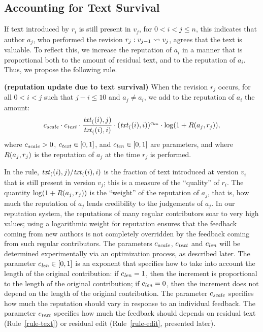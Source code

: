 \subsection{Accounting for Text Survival} 

If text introduced by $r_i$ is still present in $v_j$, for 
$0 < i < j \leq n$, this indicates that author $a_j$, who performed the
revision $r_j: v_{j-1} \rightsquigarrow v_j$, agrees that the text is valuable. 
To reflect this, we increase the reputation of $a_i$ in a manner that
is proportional both to the amount of residual text, and to the
reputation of $a_i$. 
Thus, we propose the following rule.

\begin{regola} \textbf{(reputation update due to text survival)} \label{rule-text}
  When the revision $r_j$ occurs, for all $0 < i < j$ such that 
  $j - i \leq 10$ and $a_j \neq a_i$, we add to the reputation
  of $a_i$ the amount: 
  \[
    {c_{{\text{\textit{scale}}}}} \cdot {c_{{\text{\textit{text}}}}} \cdot \frac{\mathit{txt}_{(}(i),j)}{\mathit{txt}_{(}(i),i)} 
    \cdot (\mathit{txt}_{(}(i),i))^{c_{{\text{\textit{len}}}}} \cdot \log(1 + R(a_j,r_j)),
  \]
  where ${c_{{\text{\textit{scale}}}}} > 0$, ${c_{{\text{\textit{text}}}}} \in [0,1]$, and ${c_{{\text{\textit{len}}}}} \in
  [0,1]$ are parameters, and where $R(a_j,r_j)$ is the reputation of $a_j$
  at the time $r_j$ is performed. 
\end{regola}

\noindent
In the rule, $\mathit{txt}_{(}(i),j) / \mathit{txt}_{(}(i),i)$ is the fraction of text
introduced at version $v_i$ that is still present in version $v_j$;
this is a measure of the ``quality'' of $r_i$. 
The quantity $\log(1 + R(a_j,r_j))$ is the ``weight'' of the
reputation of $a_j$, that is, how much the reputation of $a_j$ lends
credibility to the judgements of $a_j$. 
In our reputation system, the reputations of many regular contributors
soar to very high values; using a logarithmic weight for reputation
ensures that the feedback coming from new authors is not completely
overridden by the feedback coming from such regular contributors. 
The parameters ${c_{{\text{\textit{scale}}}}}$, ${c_{{\text{\textit{text}}}}}$ and ${c_{{\text{\textit{len}}}}}$ will be
determined experimentally via an optimization process, as described
later.
The parameter ${c_{{\text{\textit{len}}}}} \in [0,1]$ is an exponent that specifies how
to take into account the length of the original contribution: if
${c_{{\text{\textit{len}}}}} = 1$, then the increment is proportional to the length of
the original contribution; if ${c_{{\text{\textit{len}}}}} = 0$, then the increment
does not depend on the length of the original contribution.
The parameter ${c_{{\text{\textit{scale}}}}}$ specifies how much the reputation should
vary in response to an individual feedback. 
The parameter ${c_{{\text{\textit{text}}}}}$ specifies how much the feedback should 
depends on residual text (Rule~\ref{rule-text}) or residual edit
(Rule~\ref{rule-edit}, presented later). 

